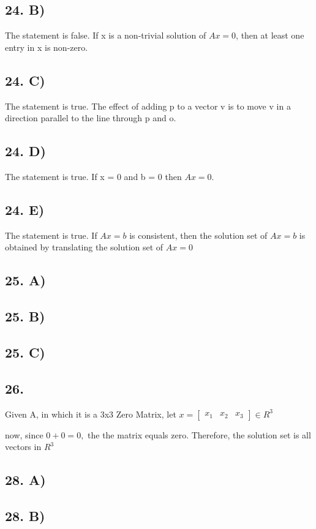 \documentclass[12]{scrartcl}
\begin{document}
\subsection*{24. B)}
The statement is false. If x is a non-trivial solution of $Ax = 0$, then at least one entry in x is non-zero. 
\subsection*{24. C)}
The statement is true. The effect of adding p to a vector v is to move v in a direction parallel to the line through p and o. 
\subsection*{24. D)}
The statement is true. If x = 0 and b = 0 then  $Ax = 0$. 
\subsection*{24. E)}
The statement is true. If $Ax = b$ is consistent, then the solution set of $Ax = b$ is obtained by translating the solution set of $Ax = 0$
\subsection*{25. A)}

\subsection*{25. B)}
\subsection*{25. C)}

\subsection*{26. }
Given A, in which it is a 3x3 Zero Matrix, 
let $x = \begin{bmatrix} x_1&x_2&x_3 \end{bmatrix} \in R^3$

now, since $0 + 0 = 0, $ the the matrix equals zero. 
Therefore, the solution set is all vectors in $R^3$
\subsection*{28. A)}
\subsection*{28. B)}
\end{document}
